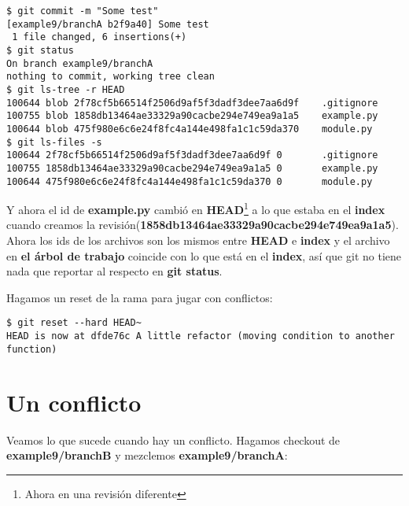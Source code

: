 \begin{lstlisting}[style=console_style,
	basicstyle=\small,
	caption=acometiendo]
$ git commit -m "Some test"
[example9/branchA b2f9a40] Some test
 1 file changed, 6 insertions(+)
$ git status
On branch example9/branchA
nothing to commit, working tree clean
$ git ls-tree -r HEAD
100644 blob 2f78cf5b66514f2506d9af5f3dadf3dee7aa6d9f    .gitignore
100755 blob 1858db13464ae33329a90cacbe294e749ea9a1a5    example.py
100644 blob 475f980e6c6e24f8fc4a144e498fa1c1c59da370    module.py
$ git ls-files -s
100644 2f78cf5b66514f2506d9af5f3dadf3dee7aa6d9f 0       .gitignore
100755 1858db13464ae33329a90cacbe294e749ea9a1a5 0       example.py
100644 475f980e6c6e24f8fc4a144e498fa1c1c59da370 0       module.py
\end{lstlisting}

Y ahora el id de {\bf example.py} cambió en {\bf HEAD}\footnote{Ahora en una revisión diferente} a lo que estaba en el {\bf index}
cuando creamos la revisión({\bf 1858db13464ae33329a90cacbe294e749ea9a1a5}). Ahora los ids de los archivos son los mismos
entre {\bf HEAD} e {\bf index} y el archivo en {\bf el árbol de trabajo} coincide con lo que está en el {\bf index}, así que
git no tiene nada que reportar al respecto en {\bf git status}.

Hagamos un reset de la rama para jugar con conflictos:

\begin{lstlisting}[style=console_style,
	basicstyle=\small,
	caption=Haciendo reset]
$ git reset --hard HEAD~
HEAD is now at dfde76c A little refactor (moving condition to another function)
\end{lstlisting}

\section{Un conflicto}
Veamos lo que sucede cuando hay un conflicto. Hagamos checkout de {\bf example9/branchB} y mezclemos {\bf example9/branchA}:

